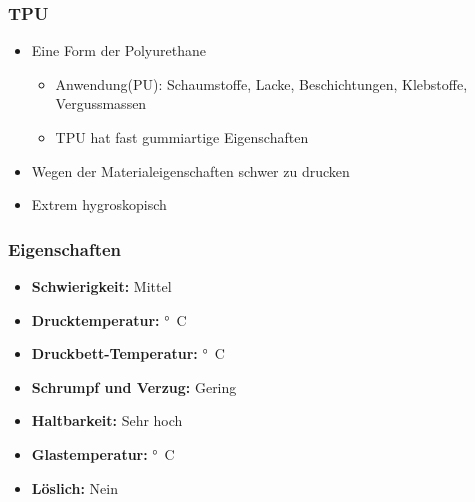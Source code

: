 {\begin{frame}
  \frametitle{TPU}
  \pause
  \begin{itemize}
    \item Eine Form der Polyurethane \pause
    \begin{itemize}
      \item Anwendung(PU): Schaumstoffe, Lacke, Beschichtungen, Klebstoffe, Vergussmassen
      \item TPU hat fast gummiartige Eigenschaften \pause
    \end{itemize}
    \item Wegen der Materialeigenschaften schwer zu drucken \pause
    \item Extrem hygroskopisch
  \end{itemize}
\end{frame}

\begin{frame}
  \frametitle{Eigenschaften}
  \pause
  \begin{itemize}
    \item \textbf{Schwierigkeit:} Mittel
    \item \textbf{Drucktemperatur:} \unit[210 - 230]{°C}
    \item \textbf{Druckbett-Temperatur:} \unit[30 - 60]{°C}
    \item \textbf{Schrumpf und Verzug:} Gering
    \item \textbf{Haltbarkeit:} Sehr hoch
    \item \textbf{Glastemperatur:} \unit[-223]{°C}
    \item \textbf{Löslich:} Nein
  \end{itemize}
\end{frame}
}

